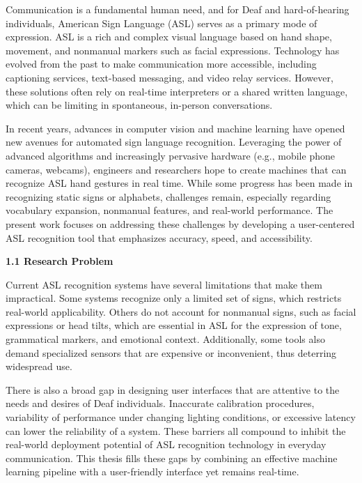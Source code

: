 \documentclass[12pt]{article}
\begin{document}
Communication is a fundamental human need, and for Deaf and hard-of-hearing individuals, 
American Sign Language (ASL) serves as a primary mode of expression. ASL is a 
rich and complex visual language based on hand shape, movement, and nonmanual markers
such as facial expressions. Technology has evolved from the past to make communication
more accessible, including captioning services, text-based messaging, and video relay services. 
However, these solutions often rely on real-time interpreters or a shared written language, 
which can be limiting in spontaneous, in-person conversations.

In recent years, advances in computer vision and machine learning have opened new avenues
for automated sign language recognition. Leveraging the power of advanced algorithms 
and increasingly pervasive hardware (e.g., mobile phone cameras, webcams), engineers and
researchers hope to create machines that can recognize ASL hand gestures in real time. While
some progress has been made in recognizing static signs or alphabets, challenges remain, 
especially regarding vocabulary expansion, nonmanual features, and real-world performance. 
The present work focuses on addressing these challenges by developing a user-centered ASL 
recognition tool that emphasizes accuracy, speed, and accessibility.

\vspace{1.5em}
\noindent
\textbf{1.1 Research Problem}
\vspace{1.5em}

Current ASL recognition systems have several limitations that make them impractical. 
Some systems recognize only a limited set of signs, which restricts real-world applicability.
Others do not account for nonmanual signs, such as facial expressions or head tilts, which
are essential in ASL for the expression of tone, grammatical markers, and emotional context.
Additionally, some tools also demand specialized sensors that are expensive or inconvenient, 
thus deterring widespread use. 

There is also a broad gap in designing user interfaces that are attentive to the needs and
desires of Deaf individuals. Inaccurate calibration procedures, variability of performance 
under changing lighting conditions, or excessive latency can lower the reliability of a system.
These barriers all compound to inhibit the real-world deployment potential of ASL recognition
technology in everyday communication. This thesis fills these gaps by combining an 
effective machine learning pipeline with a user-friendly interface yet remains real-time.
\end{document}
